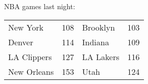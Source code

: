 NBA games last night:
\begin{tabular}{llll}
\toprule
   New York & 108 &  Brooklyn & 103 \\
     Denver & 114 &   Indiana & 109 \\
LA Clippers & 127 & LA Lakers & 116 \\
New Orleans & 153 &      Utah & 124 \\
\bottomrule
\end{tabular}

